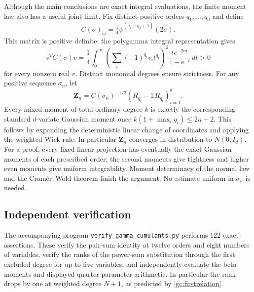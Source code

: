 Although the main conclusions are exact integral evaluations, the
finite moment law also has a useful joint limit. Fix distinct positive
orders $q_1,\ldots,q_d$ and define
\[
 C(\sigma)_{ij}=\tfrac14\psi^{(q_i+q_j+1)}(2\sigma).
\]
This matrix is positive definite: the polygamma integral representation
gives
\[
 v^TC(\sigma)v
 =\frac14\int_0^\infty
       \left(\sum_i(-1)^{q_i}v_i t^{q_i}\right)^2
                    \frac{t e^{-2\sigma t}}{1-e^{-t}}\,dt>0
\]
for every nonzero real $v$. Distinct monomial degrees ensure strictness.
For any positive sequence $\sigma_n$, let
\[
 \mathbf Z_n=C(\sigma_n)^{-1/2}
       (R_{q_i}-\mathbb ER_{q_i})_{i=1}^d.
\]
Every mixed moment of total ordinary degree $k$ is exactly the
corresponding standard $d$-variate Gaussian moment once
$k(1+\max_iq_i)\le2n+2$. This follows by expanding the deterministic
linear change of coordinates and applying the weighted Wick rule.
In particular $\mathbf Z_n$ converges in distribution to $N(0,I_d)$.
For a proof, every fixed linear projection has eventually the exact
Gaussian moments of each prescribed order; the second moments give
tightness and higher even moments give uniform integrability.
Moment determinacy of the normal law and the Cram\'er--Wold theorem
finish the argument. No estimate uniform in $\sigma_n$ is needed.

\subsection{Independent verification}

The accompanying program \texttt{verify\_gamma\_cumulants.py} performs
122 exact assertions. These verify the pair-sum identity at twelve
orders and eight numbers of variables, verify the ranks of the
power-sum substitution through the first excluded degree for up to five
variables, and independently evaluate the beta moments and displayed
quarter-parameter arithmetic. In particular the rank drops by one at
weighted degree $N+1$, as predicted by \eqref{gc:firstrelation}.

